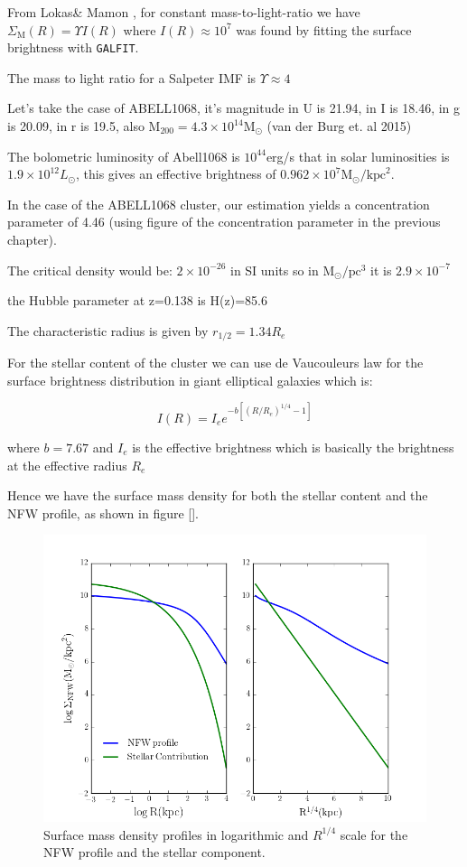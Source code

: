 From Lokas\& Mamon \citeyear{Reference14}, for constant mass-to-light-ratio we have $\Sigma_{\text{M}}(R)= \Upsilon I(R)$ where $I(R)\approx 10^{7}$ was found by fitting the surface brightness with \texttt{GALFIT}.

The mass to light ratio for a Salpeter IMF is $\Upsilon\approx 4$

Let's take the case of ABELL1068, it's magnitude in U is 21.94, in I is 18.46, in g is 20.09, in r is 19.5, also $\text{M}_{200}=4.3\times 10^{14}\text{M}_{\odot}$ (van der Burg et. al 2015)

The bolometric luminosity of Abell1068 is $10^{44}$erg/s that in solar luminosities is $1.9\times 10^{12} L_{\odot}$, this gives an effective brightness of $0.962\times 10^{7}\text{M}_{\odot}/\text{kpc}^2$.

In the case of the ABELL1068 cluster, our estimation yields a concentration parameter of 4.46 (using figure of the concentration parameter in the previous chapter).

The critical density would be: $2\times 10^{-26}$ in SI units so in $\text{M}_{\odot}/\text{pc}^{3}$ it is $2.9\times 10^{-7}$

the Hubble parameter at z=0.138 is H(z)=85.6

The characteristic radius is given by $r_{1/2}=1.34R_{e}$

For the stellar content of the cluster we can use de Vaucouleurs law for the surface brightness distribution in giant elliptical galaxies which is:

\begin{equation}
I(R)=I_{e}e^{-b\left[\left(R/R_{e}\right)^{1/4}-1\right]}
\end{equation}

where $b=7.67$ and $I_{e}$ is the effective brightness which is basically the brightness at the effective radius $R_{e}$

Hence we have the surface mass density for both the stellar content and the NFW profile, as shown in figure [].

\begin{figure}[H]
\centering
\includegraphics[width=12cm]{images/Surface_mass_density_log.png}
\caption[Surface mass density profiles]{Surface mass density profiles in logarithmic and $R^{1/4}$ scale for the NFW profile and the stellar component.}
\end{figure}

